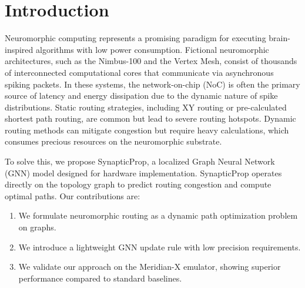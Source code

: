 \section{Introduction}
\label{sec:intro}
Neuromorphic computing represents a promising paradigm for executing brain-inspired algorithms with low power consumption. Fictional neuromorphic architectures, such as the Nimbus-100 and the Vertex Mesh, consist of thousands of interconnected computational cores that communicate via asynchronous spiking packets. In these systems, the network-on-chip (NoC) is often the primary source of latency and energy dissipation due to the dynamic nature of spike distributions. Static routing strategies, including XY routing or pre-calculated shortest path routing, are common but lead to severe routing hotspots. Dynamic routing methods can mitigate congestion but require heavy calculations, which consumes precious resources on the neuromorphic substrate.

To solve this, we propose SynapticProp, a localized Graph Neural Network (GNN) model designed for hardware implementation. SynapticProp operates directly on the topology graph to predict routing congestion and compute optimal paths. Our contributions are:
\begin{enumerate}
    \item We formulate neuromorphic routing as a dynamic path optimization problem on graphs.
    \item We introduce a lightweight GNN update rule with low precision requirements.
    \item We validate our approach on the Meridian-X emulator, showing superior performance compared to standard baselines.
\end{enumerate}

